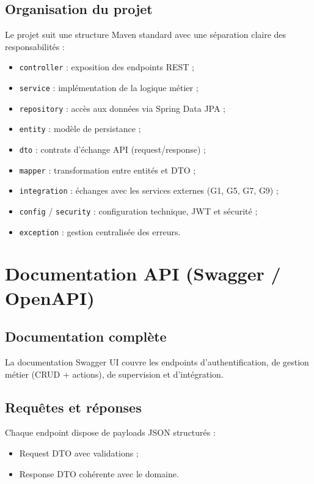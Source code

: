 \documentclass[12pt,a4paper]{report}
\begin{document}
\section{Organisation du projet}
Le projet suit une structure Maven standard avec une séparation claire des responsabilités :
\begin{itemize}
    \item \texttt{controller} : exposition des endpoints REST ;
    \item \texttt{service} : implémentation de la logique métier ;
    \item \texttt{repository} : accès aux données via Spring Data JPA ;
    \item \texttt{entity} : modèle de persistance ;
    \item \texttt{dto} : contrats d'échange API (request/response) ;
    \item \texttt{mapper} : transformation entre entités et DTO ;
    \item \texttt{integration} : échanges avec les services externes (G1, G5, G7, G9) ;
    \item \texttt{config} / \texttt{security} : configuration technique, JWT et sécurité ;
    \item \texttt{exception} : gestion centralisée des erreurs.
\end{itemize}

\chapter{Documentation API (Swagger / OpenAPI)}

\section{Documentation complète}
La documentation Swagger UI couvre les endpoints d'authentification, de gestion métier (CRUD + actions), de supervision et d'intégration.

\section{Requêtes et réponses}
Chaque endpoint dispose de payloads JSON structurés :
\begin{itemize}
    \item Request DTO avec validations ;
    \item Response DTO cohérente avec le domaine.
\end{itemize}
\end{document}
